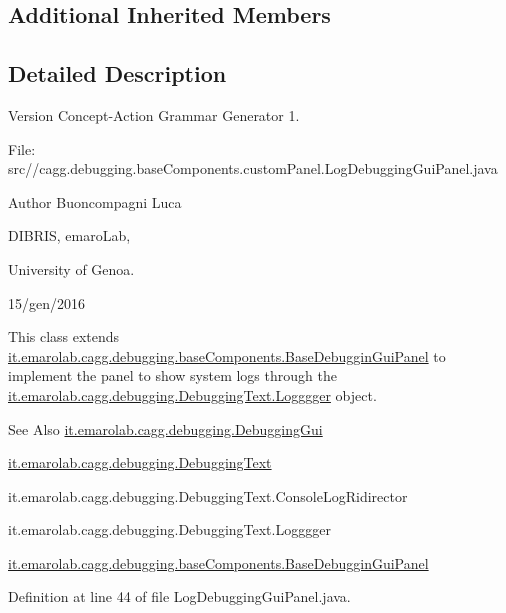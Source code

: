 \subsection*{Additional Inherited Members}


\subsection{Detailed Description}
\begin{DoxyVersion}{Version}
Concept-\/\-Action Grammar Generator 1. \par
 File\-: src//cagg.debugging.\-base\-Components.\-custom\-Panel.\-Log\-Debugging\-Gui\-Panel.\-java \par

\end{DoxyVersion}
\begin{DoxyAuthor}{Author}
Buoncompagni Luca \par
 D\-I\-B\-R\-I\-S, emaro\-Lab,\par
 University of Genoa. \par
 15/gen/2016 \par

\end{DoxyAuthor}


This class extends \hyperlink{classit_1_1emarolab_1_1cagg_1_1debugging_1_1baseComponents_1_1BaseDebugginGuiPanel}{it.\-emarolab.\-cagg.\-debugging.\-base\-Components.\-Base\-Debuggin\-Gui\-Panel} to implement the panel to show system logs through the \hyperlink{}{it.\-emarolab.\-cagg.\-debugging.\-Debugging\-Text.\-Logggger} object. 

\begin{DoxySeeAlso}{See Also}
\hyperlink{classit_1_1emarolab_1_1cagg_1_1debugging_1_1DebuggingGui}{it.\-emarolab.\-cagg.\-debugging.\-Debugging\-Gui} 

\hyperlink{classit_1_1emarolab_1_1cagg_1_1debugging_1_1DebuggingText}{it.\-emarolab.\-cagg.\-debugging.\-Debugging\-Text} 

it.\-emarolab.\-cagg.\-debugging.\-Debugging\-Text.\-Console\-Log\-Ridirector 

it.\-emarolab.\-cagg.\-debugging.\-Debugging\-Text.\-Logggger 

\hyperlink{classit_1_1emarolab_1_1cagg_1_1debugging_1_1baseComponents_1_1BaseDebugginGuiPanel}{it.\-emarolab.\-cagg.\-debugging.\-base\-Components.\-Base\-Debuggin\-Gui\-Panel} 
\end{DoxySeeAlso}


Definition at line 44 of file Log\-Debugging\-Gui\-Panel.\-java.



